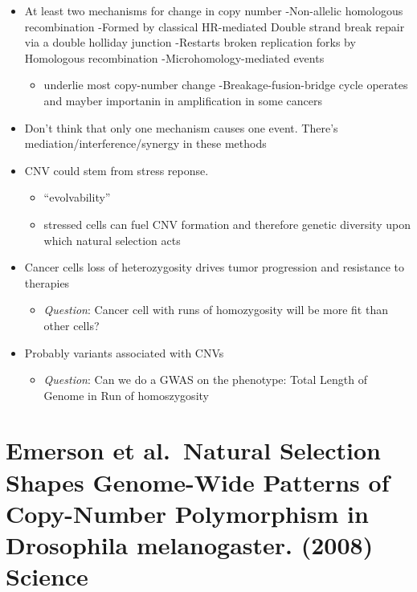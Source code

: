 \documentclass[]{book}
\providecommand{\tightlist}{%
  \setlength{\itemsep}{0pt}\setlength{\parskip}{0pt}}
\begin{document}
\begin{itemize}
\tightlist
\item
  At least two mechanisms for change in copy number
  -Non-allelic homologous recombination
  -Formed by classical HR-mediated Double strand break repair via a double holliday junction
  -Restarts broken replication forks by Homologous recombination
  -Microhomology-mediated events

  \begin{itemize}
  \tightlist
  \item
    underlie most copy-number change
    -Breakage-fusion-bridge cycle operates and mayber importanin in amplification in some cancers
  \end{itemize}
\item
  Don't think that only one mechanism causes one event. There's mediation/interference/synergy in these methods
\item
  CNV could stem from stress reponse.

  \begin{itemize}
  \tightlist
  \item
    ``evolvability''
  \item
    stressed cells can fuel CNV formation and therefore genetic diversity upon which natural selection acts
  \end{itemize}
\item
  Cancer cells loss of heterozygosity drives tumor progression and resistance to therapies

  \begin{itemize}
  \tightlist
  \item
    \emph{Question}: Cancer cell with runs of homozygosity will be more fit than other cells?
  \end{itemize}
\item
  Probably variants associated with CNVs

  \begin{itemize}
  \tightlist
  \item
    \emph{Question}: Can we do a GWAS on the phenotype: Total Length of Genome in Run of homoszygosity
  \end{itemize}
\end{itemize}

\hypertarget{emerson-et-al.natural-selection-shapes-genome-wide-patterns-of-copy-number-polymorphism-in-drosophila-melanogaster.-2008-science}{%
\section{Emerson et al.~Natural Selection Shapes Genome-Wide Patterns of Copy-Number Polymorphism in Drosophila melanogaster. (2008) Science}\label{emerson-et-al.natural-selection-shapes-genome-wide-patterns-of-copy-number-polymorphism-in-drosophila-melanogaster.-2008-science}}
\end{document}
